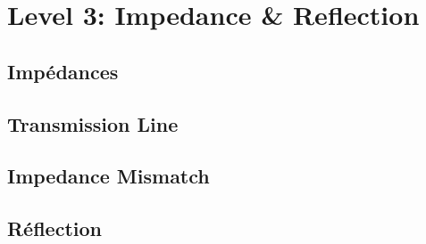 
\section{Level 3: Impedance \& Reflection}
\subsection{Impédances}
\subsection{Transmission Line}

\subsection{Impedance Mismatch}

\subsection{Réflection}
